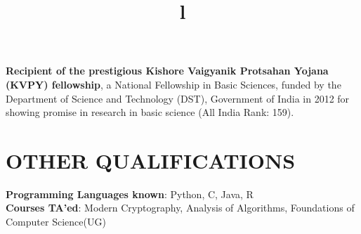 \documentclass[margin]{res}
\begin{document}
\begin{resume}
\textbf{Recipient of the prestigious Kishore Vaigyanik Protsahan Yojana (KVPY) fellowship}, a National Fellowship
in Basic Sciences, funded by the Department of Science and Technology (DST), Government of
India in 2012 for showing promise in research in basic science (All India Rank: 159).
\par

\section{OTHER QUALIFICATIONS}

\textbf{Programming Languages known}: Python, C, Java, R \\
\textbf{Courses TA'ed}: Modern Cryptography, Analysis of Algorithms, Foundations of Computer Science(UG)

\begin{format}
\title{l}\\
\\
\body\\
\end{format}



\iffalse
\section{RESEARCH INTERESTS}
Secure Computation, Cryptography, Algorithms, Computational Complexity, Communication Complexity, Information Theory.
\fi

\end{resume}
\end{document}

